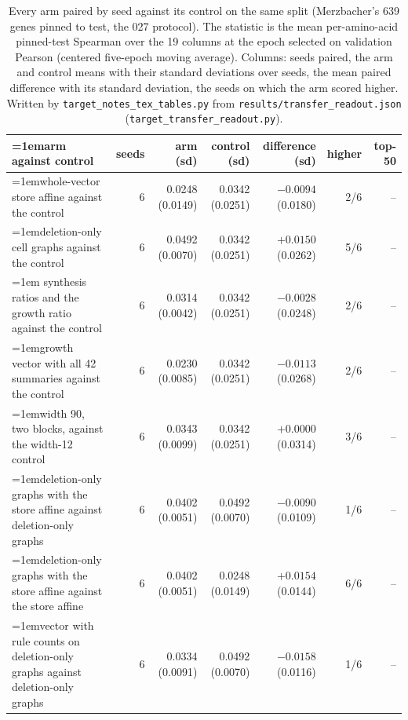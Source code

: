 \begin{table}[H]
  \centering
  \footnotesize
  \setlength{\tabcolsep}{2.5pt}
  \caption[The rounds on amino acids: arm against control]{Every arm paired by seed against its control on the same split (Merzbacher's 639 genes pinned to test, the 027 protocol). The statistic is the mean per-amino-acid pinned-test Spearman over the 19 columns at the epoch selected on validation Pearson (centered five-epoch moving average). Columns: seeds paired, the arm and control means with their standard deviations over seeds, the mean paired difference with its standard deviation, the seeds on which the arm scored higher. Written by \texttt{target\_notes\_tex\_tables.py} from \texttt{results/transfer\_readout.json} (\texttt{target\_transfer\_readout.py}).}
  \label{tab:target-transfer}
  \begin{tabular}{@{}>{\raggedright\hangindent=1em\hangafter=1\arraybackslash}p{84.3mm}rrrrrr@{}}
    \hline
    arm against control & seeds & arm (sd) & control (sd) & difference (sd) & higher & top-50 \\
    \hline
    whole-vector store affine against the control & 6 & 0.0248 (0.0149) & 0.0342 (0.0251) & $-0.0094$ (0.0180) & 2/6 & -- \\
    deletion-only cell graphs against the control & 6 & 0.0492 (0.0070) & 0.0342 (0.0251) & $+0.0150$ (0.0262) & 5/6 & -- \\
    19 synthesis ratios and the growth ratio against the control & 6 & 0.0314 (0.0042) & 0.0342 (0.0251) & $-0.0028$ (0.0248) & 2/6 & -- \\
    growth vector with all 42 summaries against the control & 6 & 0.0230 (0.0085) & 0.0342 (0.0251) & $-0.0113$ (0.0268) & 2/6 & -- \\
    width 90, two blocks, against the width-12 control & 6 & 0.0343 (0.0099) & 0.0342 (0.0251) & $+0.0000$ (0.0314) & 3/6 & -- \\
    deletion-only graphs with the store affine against deletion-only graphs & 6 & 0.0402 (0.0051) & 0.0492 (0.0070) & $-0.0090$ (0.0109) & 1/6 & -- \\
    deletion-only graphs with the store affine against the store affine & 6 & 0.0402 (0.0051) & 0.0248 (0.0149) & $+0.0154$ (0.0144) & 6/6 & -- \\
    vector with rule counts on deletion-only graphs against deletion-only graphs & 6 & 0.0334 (0.0091) & 0.0492 (0.0070) & $-0.0158$ (0.0116) & 1/6 & -- \\

\end{tabular}
\end{table}
